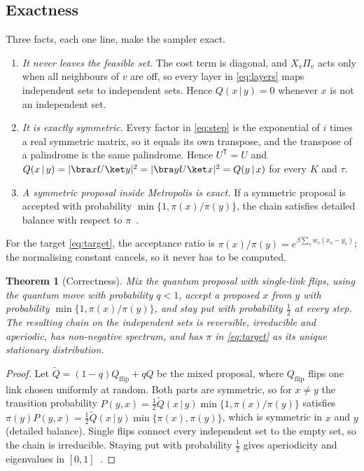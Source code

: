 \documentclass[11pt,a4paper]{article}
\newtheorem{theorem}{Theorem}
\begin{document}
\subsection{Exactness}
Three facts, each one line, make the sampler exact.
\begin{enumerate}[leftmargin=*]
\item \emph{It never leaves the feasible set.} The cost term is diagonal, and $X_v\Pi_v$ acts only when
all neighbours of $v$ are off, so every layer in \eqref{eq:layers} maps independent sets to
independent sets. Hence $Q(x\,|\,y)=0$ whenever $x$ is not an independent set.
\item \emph{It is exactly symmetric.} Every factor in \eqref{eq:step} is the exponential of $i$ times a
real symmetric matrix, so it equals its own transpose, and the transpose of a palindrome is the same
palindrome. Hence $U^{\mathsf T}=U$ and $Q(x\,|\,y)=|\bra xU\ket y|^2=|\bra yU\ket x|^2=Q(y\,|\,x)$ for
every $K$ and $\tau$.
\item \emph{A symmetric proposal inside Metropolis is exact.} If a symmetric proposal is accepted with
probability $\min\{1,\pi(x)/\pi(y)\}$, the chain satisfies detailed balance with respect to
$\pi$~\cite{metropolis1953equation,hastings1970monte}.
\end{enumerate}
For the target \eqref{eq:target}, the acceptance ratio is $\pi(x)/\pi(y)=e^{\beta\sum_vw_v(x_v-y_v)}$;
the normalising constant cancels, so it never has to be computed.

\begin{theorem}[Correctness]\label{thm:correct}
Mix the quantum proposal with single-link flips, using the quantum move with probability $q<1$, accept
a proposed $x$ from $y$ with probability $\min\{1,\pi(x)/\pi(y)\}$, and stay put with probability
$\frac12$ at every step. The resulting chain on the independent sets is reversible, irreducible and
aperiodic, has non-negative spectrum, and has $\pi$ in \eqref{eq:target} as its unique stationary
distribution.
\end{theorem}

\begin{proof}
Let $\tilde Q=(1-q)Q_{\mathrm{flip}}+qQ$ be the mixed proposal, where $Q_{\mathrm{flip}}$ flips one link
chosen uniformly at random. Both parts are symmetric, so for $x\ne y$ the transition probability
$P(y,x)=\tfrac12\tilde Q(x\,|\,y)\min\{1,\pi(x)/\pi(y)\}$ satisfies
$\pi(y)P(y,x)=\tfrac12\tilde Q(x\,|\,y)\min\{\pi(x),\pi(y)\}$, which is symmetric in $x$ and $y$
(detailed balance). Single flips connect every independent set to the empty set, so the chain is
irreducible. Staying put with probability $\frac12$ gives aperiodicity and eigenvalues in
$[0,1]$~\cite{levin2017markov}.
\end{proof}
\end{document}
